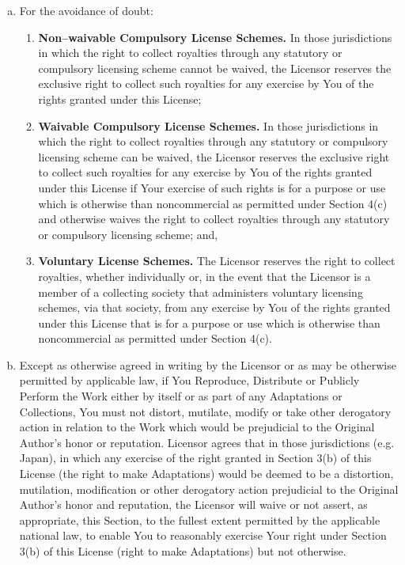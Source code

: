 \documentclass[12pt,letterpaper,oneside,final]{memoir}
\begin{document}
\begin{appendices}
\begin{enumerate}[1.]
\begin{enumerate}[a.]
   \item For the avoidance of doubt:
      \begin{enumerate}
         \item \begin{midsloppypar} \textbf{Non--waivable  Compulsory License Schemes.} In those jurisdictions in which the right to collect royalties through any statutory or compulsory lic\-en\-sing scheme cannot be waived, the Licensor reserves the exclusive right to col\-lect such royalties for any exercise by You of the rights granted under this License; \end{midsloppypar}
         \item \textbf{Waivable Compulsory License Schemes.} In those jurisdictions in which the right to collect royalties through any statutory or compulsory licensing scheme can be waived, the Licensor reserves the exclusive right to collect such royalties for any exercise by You of the rights granted under this License if Your exercise of such rights is for a purpose or use which is otherwise than noncommercial as permitted under Section 4(c) and otherwise waives the right to collect royalties through any statutory or compulsory licensing scheme; and,
         \item \textbf{Voluntary License Schemes.} The Licensor reserves the right to collect royalties, whether individually or, in the event that the Licensor is a member of a collecting society that administers voluntary licensing schemes, via that society, from any exercise by You of the rights granted under this License that is for a purpose or use which is otherwise than noncommercial as permitted under Section 4(c).
         \end{enumerate}
   \item Except as otherwise agreed in writing by the Licensor or as may be otherwise permitted by applicable law, if You Reproduce, Distribute or Publicly Perform the Work either by itself or as part of any Adaptations or Collections, You must not distort, mutilate, modify or take other derogatory action in relation to the Work which would be prejudicial to the Original Author's honor or reputation. Licensor agrees that in those jurisdictions (e.g. Japan), in which any exercise of the right granted in Section 3(b) of this License (the right to make Adaptations) would be deemed to be a distortion, mutilation, modification or other derogatory action prejudicial to the Original Author's honor and reputation, the Licensor will waive or not assert, as appropriate, this Section, to the fullest extent permitted by the applicable national law, to enable You to reasonably exercise Your right under Section 3(b) of this License (right to make Adaptations) but not otherwise.
   \end{enumerate}


\end{enumerate}
\end{appendices}
\end{document}
